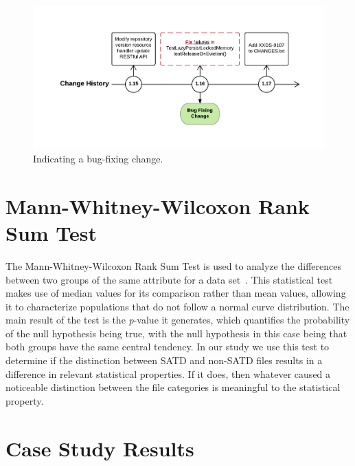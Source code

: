 \begin{figure}[h]
	\centering
	\includegraphics[width=150mm]{figures/chapter3/bug-fixing-change}
	\caption{Indicating a bug-fixing change.}
	\label{fig:indicating-a-bug-fixing-change}
\end{figure}



\section{Mann-Whitney-Wilcoxon Rank Sum Test}
The Mann-Whitney-Wilcoxon Rank Sum Test is used to analyze the differences between two groups of the same attribute for a data set~\cite{mann1947test}. This statistical test makes use of median values for its comparison rather than mean values, allowing it to characterize populations that do not follow a normal curve distribution. The main result of the test is the \textit{p}-value it generates, which quantifies the probability of the null hypothesis being true, with the null hypothesis in this case being that both groups have the same central tendency. In our study we use this test to determine if the distinction between SATD and non-SATD files results in a difference in relevant statistical properties. If it does, then whatever caused a noticeable distinction between the file categories is meaningful to the statistical property. 




\section{Case Study Results}
\label{chap3:sec:results}

